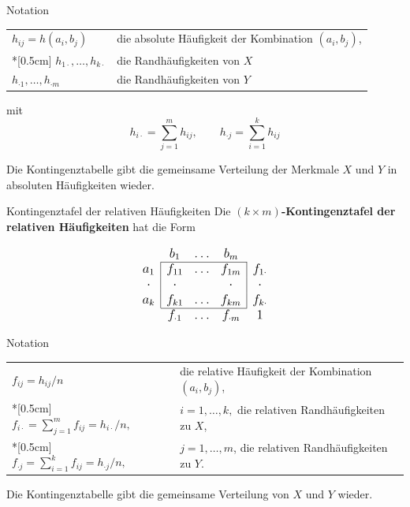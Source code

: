 \documentclass[
  10pt,
  ignorenonframetext,
]{beamer}
\begin{document}
\begin{frame}{Notation}
\protect\hypertarget{notation}{}
\begin{center}
  \begin{tabular}{ll}
  $h_{ij} = h(a_i,b_j)$           & die absolute Häufigkeit der Kombination $(a_i,b_j)$,\\*[0.5cm]
  $h_{1\cdot},\dots,h_{k\cdot}$   & die Randhäufigkeiten von $X$ \\
  $h_{\cdot 1},\dots,h_{\cdot m}$ & die Randhäufigkeiten von $Y$ \\
  \end{tabular}
\end{center}

mit
\[h_{i\cdot} = \sum^m_{j=1} h_{ij},\qquad h_{\cdot j} = \sum^k_{i=1} h_{ij}\]

Die Kontingenztabelle gibt die gemeinsame Verteilung der Merkmale \(X\)
und \(Y\) in absoluten Häufigkeiten wieder.
\end{frame}

\begin{frame}{Kontingenztafel der relativen Häufigkeiten}
\protect\hypertarget{kontingenztafel-der-relativen-huxe4ufigkeiten}{}
Die \textbf{\((k\times m)\)-Kontingenztafel der relativen Häufigkeiten}
hat die Form

\vspace*{1cm}

\begin{displaymath}
\begin{large}
\begin{array}{c|ccc|c}
\multicolumn{1}{c}{}
& \multicolumn{1}{c}{b_1}
  & \dots
    & \multicolumn{1}{c}{b_m}\\\cline{2-4}
a_1 & f_{11} & \dots & f_{1m} & f_{1\cdot}\\
\cdot & \cdot & & \cdot & \cdot \\
a_k & f_{k1} & \dots & f_{km} & f_{k\cdot}\\\cline{2-4}
\multicolumn{1}{c}{}
  & \multicolumn{1}{c}{f_{\cdot 1} }
    & \dots
      & \multicolumn{1}{c}{f_{\cdot m} }
        & \multicolumn{1}{c}{1}
\end{array}
\end{large}
\end{displaymath}
\end{frame}

\begin{frame}{Notation}
\protect\hypertarget{notation-1}{}
\begin{center}
\begin{tabular}{lp{9cm}}
$f_{ij} = h_{ij}/n$ & die relative Häufigkeit der Kombination $(a_i,b_j)$, \\*[0.5cm]
$f_{i\cdot}=\sum\limits_{j=1}^m f_{ij} = h_{i\cdot}/n,$
                 & $i=1,\dots,k,$ die relativen Randhäufigkeiten zu $X$,\\*[0.5cm]
$f_{\cdot j}=\sum\limits_{i=1}^k f_{ij} = h_{\cdot j}/n,$
                 & $j=1,\dots,m$, die relativen Randhäufigkeiten zu $Y$.
\end{tabular}
\end{center}

Die Kontingenztabelle gibt die gemeinsame Verteilung von \(X\) und \(Y\)
wieder.
\end{frame}
\end{document}
